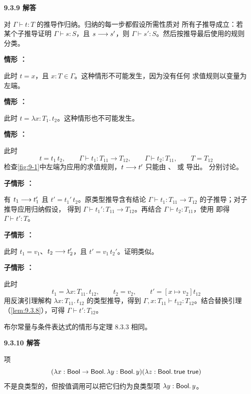 \begin{taplauthorsolutionentrybox}
\label{sol:author:9.3.9}
\textbf{9.3.9 解答}

对 \(\Gamma\vdash t:T\) 的推导作归纳。归纳的每一步都假设所需性质对
所有子推导成立：若某个子推导证明 \(\Gamma\vdash s:S\)，且
\(s\mathrel{\longrightarrow} s'\)，则 \(\Gamma\vdash s':S\)。然后按推导最后使用的规则
分类。

\medskip\noindent
\textbf{情形 ：}

此时 \(t=x\)，且 \(x:T\in\Gamma\)。这种情形不可能发生，因为没有任何
求值规则以变量为左端。

\medskip\noindent
\textbf{情形 ：}

此时 \(t=\lambda x:T_1.\,t_2\)。这种情形也不可能发生。

\medskip\noindent
\textbf{情形 ：}

此时
\[
  t=t_1\,t_2,
  \qquad
  \Gamma\vdash t_1:T_{11}\to T_{12},
  \qquad
  \Gamma\vdash t_2:T_{11},
  \qquad
  T=T_{12}
\]
检查\cref{fig:9-1}中左端为应用的求值规则，\(t\mathrel{\longrightarrow} t'\) 只能由
、 或  导出。
分别讨论。

\smallskip\noindent
\textbf{子情形 ：}

有 \(t_1\mathrel{\longrightarrow} t_1'\) 且 \(t'=t_1'\,t_2\)。原类型推导含有结论
\(\Gamma\vdash t_1:T_{11}\to T_{12}\) 的子推导；对子推导应用归纳假设，
得到 \(\Gamma\vdash t_1':T_{11}\to T_{12}\)。再结合
\(\Gamma\vdash t_2:T_{11}\)，使用  即得
\(\Gamma\vdash t':T\)。

\smallskip\noindent
\textbf{子情形 ：}

此时 \(t_1=v_1\)、\(t_2\mathrel{\longrightarrow} t_2'\)，且 \(t'=v_1\,t_2'\)。证明类似。

\smallskip\noindent
\textbf{子情形 ：}

此时
\[
  t_1=\lambda x:T_{11}.\,t_{12},
  \qquad
  t_2=v_2,
  \qquad
  t'=[x\mapsto v_2]t_{12}
\]
用反演引理解构 \(\lambda x:T_{11}.\,t_{12}\) 的类型推导，得到
\(\Gamma,x:T_{11}\vdash t_{12}:T_{12}\)。结合替换引理
（\cref{lem:9.3.8}），可得 \(\Gamma\vdash t':T_{12}\)。

布尔常量与条件表达式的情形与定理 8.3.3 相同。

\end{taplauthorsolutionentrybox}

\begin{taplauthorsolutionentrybox}
\label{sol:author:9.3.10}
\textbf{9.3.10 解答}

项
\[
  (\lambda x:\mathsf{Bool}\to\mathsf{Bool}.\,
     \lambda y:\mathsf{Bool}.\,y)
  (\lambda z:\mathsf{Bool}.\,\mathsf{true}\ \mathsf{true})
\]
不是良类型的，但按值调用可以把它归约为良类型项
\(\lambda y:\mathsf{Bool}.\,y\)。

\end{taplauthorsolutionentrybox}

